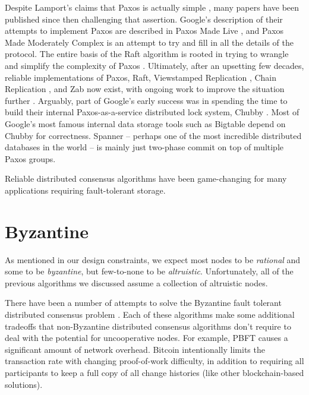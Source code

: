 \documentclass[11pt,fleqn,openany]{book}
\begin{document}
Despite Lamport's claims that Paxos is actually simple \cite{paxos-simple},
many papers have been published since then
challenging that assertion. Google's description of their attempts to implement
Paxos are described in Paxos Made Live \cite{paxos-live},
and Paxos Made Moderately
Complex \cite{paxos-complex} is an attempt to try and fill in all the details of
the protocol. The entire basis of the Raft algorithm is rooted in trying to
wrangle and simplify the complexity of Paxos \cite{raft}. Ultimately, after an
upsetting few decades, reliable implementations of Paxos, Raft, Viewstamped
Replication \cite{vrr}, Chain Replication \cite{chain-rep}, and Zab \cite{zab}
now exist, with ongoing work to improve the situation
further \cite{epaxos,paxos-flexible}. Arguably, part of Google's early success
was in spending the time to build their internal Paxos-as-a-service distributed
lock system, Chubby \cite{chubby}. Most of Google's most famous internal data
storage tools such as Bigtable \cite{bigtable} depend on Chubby for
correctness. Spanner \cite{spanner} -- perhaps one of the most incredible
distributed databases in the world -- is mainly just two-phase commit on top of
multiple Paxos groups.

Reliable distributed consensus algorithms have been game-changing for many
applications requiring fault-tolerant storage.

\section{Byzantine}

As mentioned in our design constraints, we expect most nodes to be {\em
rational} and some to be {\em byzantine}, but few-to-none to be {\em
altruistic}. Unfortunately, all of the previous algorithms we discussed assume a
collection of altruistic nodes.

There have been a number of attempts to solve the Byzantine fault tolerant
distributed consensus problem
\cite{bitcoin,pbft,qu,fab,fab-revisited,zyzzyva,rbft,
tangaroa,tendermint,aliph,hashgraph,honeybadger,algorand,casper,
tangle,avalanche,parsec,mickens-bft}. Each of these algorithms make some
additional tradeoffs that non-Byzantine distributed consensus algorithms don't
require to deal with the potential for uncooperative nodes. For example,
PBFT \cite{pbft} causes a significant amount of network overhead. Bitcoin
\cite{bitcoin} intentionally limits the transaction rate with changing
proof-of-work difficulty, in addition to requiring all participants to keep a
full copy of all change histories (like other blockchain-based
solutions).
\end{document}
